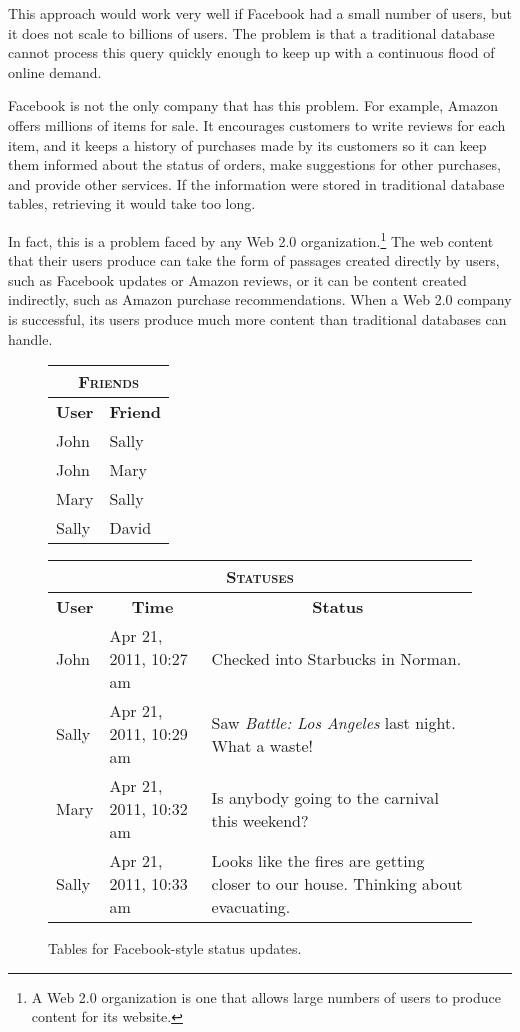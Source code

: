 This approach would work very well if Facebook had a small number of users,
but it does not scale to billions of users.
The problem is that a traditional database cannot process
this query quickly enough to keep up with a continuous
flood of online demand.

Facebook is not the only company that has this problem.
For example, Amazon
offers millions of items for sale.
It encourages customers to write reviews for each item, and it keeps a history
of purchases made by its customers so it can keep them informed about the status of orders,
make suggestions for other purchases, and provide other services.
If the information were stored in traditional database tables,
retrieving it would take too long.

In fact, this is a problem faced by any
Web 2.0 organization.\footnote{A
Web 2.0 organization is one that allows large numbers
of users to produce content for its website.}
The web content that their users produce
can take the form of passages created directly by users,
such as Facebook updates or Amazon reviews, or it can be content created
indirectly, such as Amazon purchase recommendations.
When a Web 2.0 company is successful,
its users produce much more content than traditional databases can handle.

\begin{figure}
	\begin{center}
		\begin{tabular}[t]{ll}
			\hline
			\multicolumn{2}{c}{\textsc{Friends}} \\
			\hline
			\multicolumn{1}{c}{\textbf{User}} & \multicolumn{1}{c}{\textbf{Friend}} \\
			\hline
			John  & Sally \\
			John  & Mary \\
			Mary  & Sally \\
			Sally & David \\
			\hline
		\end{tabular}
		\hspace{.5in}
		\begin{tabular}[t]{llp{1in}}
			\hline
			\multicolumn{3}{c}{\textsc{Statuses}} \\
			\hline
			\multicolumn{1}{c}{\textbf{User}} & \multicolumn{1}{c}{\textbf{Time}} & \multicolumn{1}{c}{\textbf{Status}} \\
			\hline
			John  & Apr 21, 2011, 10:27 am & \raggedright Checked into Starbucks in Norman. \tabularnewline
			Sally & Apr 21, 2011, 10:29 am & \raggedright Saw \emph{Battle: Los Angeles} last night.  What a waste! \tabularnewline
			Mary  & Apr 21, 2011, 10:32 am & \raggedright Is anybody going to the carnival this weekend? \tabularnewline
			Sally & Apr 21, 2011, 10:33 am & \raggedright Looks like the fires are getting closer to our house.  Thinking about evacuating. \tabularnewline
			\hline
		\end{tabular}
	\end{center}
	\caption{Tables for Facebook-style status updates.}
	\label{facebook-tables}
\end{figure}

